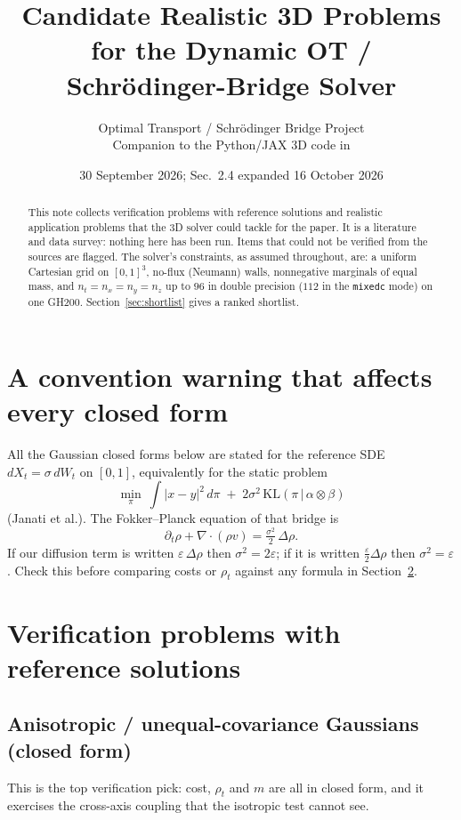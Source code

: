 \documentclass[11pt]{article}
\title{Candidate Realistic 3D Problems\\ for the Dynamic OT / Schr\"odinger-Bridge Solver}
\author{Optimal Transport / Schr\"odinger Bridge Project\\
Companion to the Python/JAX 3D code in \code{python/3d}}
\date{30 September 2026; Sec.~2.4 expanded 16 October 2026}
\newcommand{\eps}{\varepsilon}
\newcommand{\code}[1]{\texttt{#1}}
\newcommand{\dv}{\nabla\cdot}
\begin{document}
\maketitle

\begin{abstract}
This note collects verification problems with reference solutions and realistic
application problems that the 3D solver could tackle for the paper. It is a
literature and data survey: nothing here has been run. Items that could not be
verified from the sources are flagged. The solver's constraints, as assumed
throughout, are: a uniform Cartesian grid on $[0,1]^3$, no-flux (Neumann) walls,
nonnegative marginals of equal mass, and $n_t=n_x=n_y=n_z$ up to $96$ in double
precision ($112$ in the \code{mixedc} mode) on one GH200. Section~\ref{sec:shortlist}
gives a ranked shortlist.
\end{abstract}

\section{A convention warning that affects every closed form}
\label{sec:convention}

All the Gaussian closed forms below are stated for the reference SDE
$dX_t=\sigma\,dW_t$ on $[0,1]$, equivalently for the static problem
\[
  \min_{\pi}\ \int |x-y|^2\,d\pi \;+\; 2\sigma^2\,\mathrm{KL}(\pi\,|\,\alpha\otimes\beta)
\]
(Janati et al.). The Fokker--Planck equation of that bridge is
\[
  \partial_t\rho + \dv(\rho v) = \tfrac{\sigma^2}{2}\,\Delta\rho .
\]
If our diffusion term is written $\eps\,\Delta\rho$ then $\sigma^2 = 2\eps$; if it is
written $\tfrac{\eps}{2}\Delta\rho$ then $\sigma^2=\eps$. Check this before comparing
costs or $\rho_t$ against any formula in Section~\ref{sec:verification}.

\section{Verification problems with reference solutions}
\label{sec:verification}

\subsection{Anisotropic / unequal-covariance Gaussians (closed form)}
\label{sec:gaussian}

This is the top verification pick: cost, $\rho_t$ and $m$ are all in closed form,
and it exercises the cross-axis coupling that the isotropic test cannot see.
\end{document}
